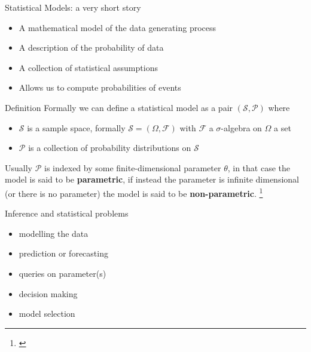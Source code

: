 \documentclass{beamer}
\newcommand\blfootnote[1]{%
  \begingroup
  \renewcommand\thefootnote{}\footnote{#1}%
  \addtocounter{footnote}{-1}%
  \endgroup
}
\begin{document}
\begin{frame}{Statistical Models: a very short story}
	\begin{itemize}
		\item A mathematical model of the data generating process
		\item A description of the probability of data  
		\item A collection of statistical assumptions 
		\item Allows us to compute probabilities of events 
	\end{itemize}
	\begin{block}{Definition}
		Formally we can define a statistical model as a pair $(\mathcal{S}, \mathcal{P})$
		where
		\begin{itemize}
			\item $\mathcal{S}$ is a sample space, 
				formally $\mathcal{S} = (\Omega, \mathcal{F})$ with $\mathcal{F}$ a $\sigma$-algebra on $\Omega$ a set 
			\item $\mathcal{P}$ is a collection of probability distributions on $\mathcal{S}$ 
		\end{itemize}
	\end{block}
	Usually $\mathcal{P}$ is indexed by some finite-dimensional parameter $\theta$, in that case the model is said to be \textbf{parametric}, if instead the parameter is infinite dimensional (or there is no parameter) the model is said to be \textbf{non-parametric}.
	\blfootnote{\citep{wasserman2004all}}
\end{frame}

\begin{frame}{Inference and statistical problems}
	\begin{itemize}
		\item<1-> modelling the data     
			\vspace{0.3cm}
		\item<2-> prediction or forecasting 
			\vspace{0.3cm}
		\item<3-> queries on parameter(s)  
			\vspace{0.3cm}
	        \item<4-> decision making  
			\vspace{0.3cm}
		\item<5-> model selection 
	\end{itemize}
\end{frame}
\end{document}
